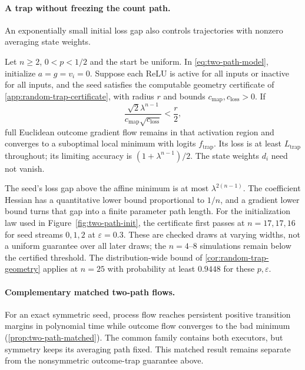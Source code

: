 \paragraph{A trap without freezing the count path.}
An exponentially small initial loss gap also controls trajectories with nonzero
averaging state weights.
\begin{proposition}
\label{prop:random-outcome-trap}
Let $n\ge2$, $0<p<1/2$ and the start be uniform. In \cref{eq:two-path-model},
initialize $a=g=v_i=0$. Suppose each ReLU is active for all inputs or inactive for all inputs,
and the seed satisfies the computable geometry certificate of
\cref{app:random-trap-certificate}, with radius $r$ and bounds
$c_{\mathrm{map}},c_{\mathrm{loss}}>0$. If
\[
 \frac{\sqrt2\lambda^{n-1}}{c_{\mathrm{map}}\sqrt{c_{\mathrm{loss}}}}<\frac r2,
\]
full Euclidean outcome gradient flow remains in that activation region and
converges to a suboptimal local minimum with logits $f_{\mathrm{trap}}$.
Its loss is at least $L_{\mathrm{trap}}$ throughout; its limiting accuracy is
$(1+\lambda^{n-1})/2$. The state weights $d_i$ need not vanish.
\end{proposition}
The seed's loss gap above the affine minimum is at most $\lambda^{2(n-1)}$.
The coefficient Hessian has a quantitative lower bound proportional to $1/n$,
and a gradient lower bound turns that gap into a finite parameter path length.
For the initialization law used in Figure~\ref{fig:two-path-init}, the certificate
first passes at $n=17,17,16$ for seed streams $0,1,2$ at $\varepsilon=0.3$.
These are checked draws at varying widths, not a uniform guarantee over all
later draws; the $n=4$--$8$ simulations remain below the certified threshold.
The distribution-wide bound of \cref{cor:random-trap-geometry} applies at $n=25$
with probability at least $0.9448$ for these $p,\varepsilon$.

\paragraph{Complementary matched two-path flows.}
For an exact symmetric seed, process flow reaches persistent positive transition
margins in polynomial time while outcome flow converges to the bad minimum
(\cref{prop:two-path-matched}). The common family contains both executors,
but symmetry keeps its averaging path fixed. This matched result remains
separate from the nonsymmetric outcome-trap guarantee above.

\suppressfloats[t]
